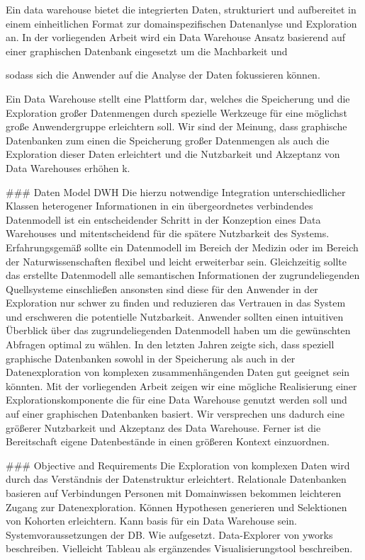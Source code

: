 Ein data warehouse bietet die integrierten Daten, strukturiert und aufbereitet in einem einheitlichen Format zur domainspezifischen Datenanlyse und Exploration an. In der vorliegenden Arbeit wird ein Data Warehouse Ansatz basierend auf einer graphischen Datenbank eingesetzt um die Machbarkeit und 

 sodass sich die Anwender auf die Analyse der Daten fokussieren können.


Ein Data Warehouse stellt eine Plattform dar, welches die Speicherung und die Exploration großer Datenmengen durch spezielle Werkzeuge für eine möglichst große Anwendergruppe erleichtern soll. Wir sind der Meinung, dass graphische Datenbanken zum einen die Speicherung großer Datenmengen als auch die Exploration dieser Daten erleichtert und die Nutzbarkeit und Akzeptanz von Data Warehouses erhöhen k. 

### Daten Model DWH
Die hierzu notwendige Integration unterschiedlicher Klassen heterogener Informationen in ein übergeordnetes verbindendes Datenmodell ist ein entscheidender Schritt in der Konzeption eines Data Warehouses und mitentscheidend für die spätere Nutzbarkeit des Systems. Erfahrungsgemäß sollte ein Datenmodell im Bereich der Medizin oder im Bereich der Naturwissenschaften flexibel und leicht erweiterbar sein. Gleichzeitig sollte das erstellte Datenmodell alle semantischen Informationen der zugrundeliegenden Quellsysteme einschließen ansonsten sind diese für den Anwender in der Exploration nur schwer zu finden und reduzieren das Vertrauen in das System und erschweren die potentielle Nutzbarkeit. 
Anwender sollten einen intuitiven Überblick über das zugrundeliegenden Datenmodell haben um die gewünschten Abfragen optimal zu wählen. In den letzten Jahren zeigte sich, dass speziell graphische Datenbanken sowohl in der Speicherung als auch in der Datenexploration von komplexen zusammenhängenden Daten gut geeignet sein könnten. Mit der vorliegenden Arbeit zeigen wir eine mögliche Realisierung einer Explorationskomponente die für eine Data Warehouse genutzt werden soll und auf einer graphischen Datenbanken basiert. Wir versprechen uns dadurch eine größerer Nutzbarkeit und Akzeptanz des Data Warehouse. Ferner ist die Bereitschaft eigene Datenbestände in einen größeren Kontext einzuordnen.

### Objective and Requirements
Die Exploration von komplexen Daten wird durch das Verständnis der Datenstruktur erleichtert. Relationale Datenbanken basieren auf Verbindungen 
Personen mit Domainwissen bekommen leichteren Zugang zur Datenexploration. Können Hypothesen generieren und Selektionen von Kohorten erleichtern. Kann basis für ein Data Warehouse sein. 
Systemvoraussetzungen der DB. Wie aufgesetzt. Data-Explorer von yworks beschreiben. Vielleicht Tableau als ergänzendes Visualisierungstool beschreiben.


